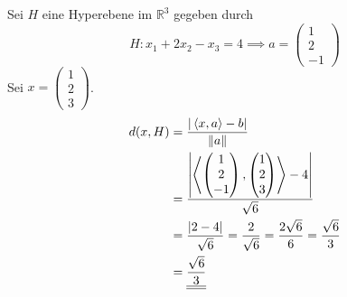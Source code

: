 \begin{example}
    Sei $H$ eine Hyperebene im $\mathbb{R}^3$ gegeben durch
    \[
        H:x_1 + 2x_2 - x_3 = 4 \implies a = \begin{pmatrix}
            1\\2\\-1
        \end{pmatrix}
    \]
    Sei $x = \begin{pmatrix}
        1\\2\\3
    \end{pmatrix}$.
    \begin{align*}
        d(x,H) &= \frac{\vert\left\langle x,a \right\rangle-b\vert}{\left\lVert a \right\rVert}\\
        &= \frac{\left\vert \left\langle \begin{pmatrix}
            1\\2\\-1
        \end{pmatrix},\begin{pmatrix}
            1\\2\\3
        \end{pmatrix} \right\rangle -4\right\vert}{\sqrt{6}}\\
        &= \frac{\vert 2 - 4\vert}{\sqrt{6}} = \frac{2}{\sqrt{6}} = \frac{2\sqrt{6}}{6} = \frac{\sqrt{6}}{3}\\
        &= \underline{\underline{\frac{\sqrt{6}}{3}}}
    \end{align*}
\end{example}